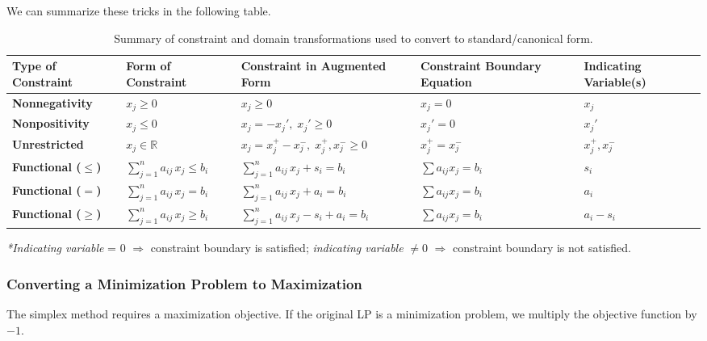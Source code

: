 We can summarize these tricks in the following table.
\begin{table}[h!]
\centering
\renewcommand{\arraystretch}{1.4}
\begin{tabular}{l|l|l|l|l}
\hline
\textbf{Type of Constraint} 
  & \textbf{Form of Constraint}
  & \textbf{Constraint in Augmented Form}
  & \textbf{Constraint Boundary Equation}
  & \textbf{Indicating Variable(s)} \\
\hline
\textbf{Nonnegativity}
  & $x_j \ge 0$
  & $x_j \ge 0$
  & $x_j = 0$
  & $x_j$ \\
\hline
\textbf{Nonpositivity}
  & $x_j \le 0$
  & $x_j = -x_j',\; x_j' \ge 0$
  & $x_j' = 0$
  & $x_j'$ \\
\hline
\textbf{Unrestricted}
  & $x_j \in \mathbb{R}$
  & $x_j = x_j^+ - x_j^-,\; x_j^+, x_j^- \ge 0$
  & $x_j^+ = x_j^-$
  & $x_j^+, x_j^-$ \\
\hline
\textbf{Functional ($\le$)}
  & $\displaystyle \sum_{j=1}^n a_{ij}\,x_j \le b_i$
  & $\displaystyle \sum_{j=1}^n a_{ij}\,x_j + s_i = b_i$
  & $\displaystyle \sum a_{ij} x_j = b_i$
  & $s_i$ \\
\hline
\textbf{Functional ($=$)}
  & $\displaystyle \sum_{j=1}^n a_{ij}\,x_j = b_i$
  & $\displaystyle \sum_{j=1}^n a_{ij}\,x_j + a_i = b_i$
  & $\displaystyle \sum a_{ij} x_j = b_i$
  & $a_i$ \\
\hline
\textbf{Functional ($\ge$)}
  & $\displaystyle \sum_{j=1}^n a_{ij}\,x_j \ge b_i$
  & $\displaystyle \sum_{j=1}^n a_{ij}\,x_j - s_i + a_i = b_i$
  & $\displaystyle \sum a_{ij} x_j = b_i$
  & $a_i - s_i$ \\
\hline
\end{tabular}

\vspace{5pt}
\footnotesize{
\emph{*Indicating variable} = 0 $\Longrightarrow$ constraint boundary is satisfied; 
\emph{indicating variable} $\neq 0$ $\Longrightarrow$ constraint boundary is not satisfied.
}
\caption{Summary of constraint and domain transformations used to convert to standard/canonical form.}
\end{table}



\subsubsection{Converting a Minimization Problem to Maximization}

The simplex method requires a maximization objective. If the original LP is a minimization problem, we multiply the objective function by \( -1 \).

